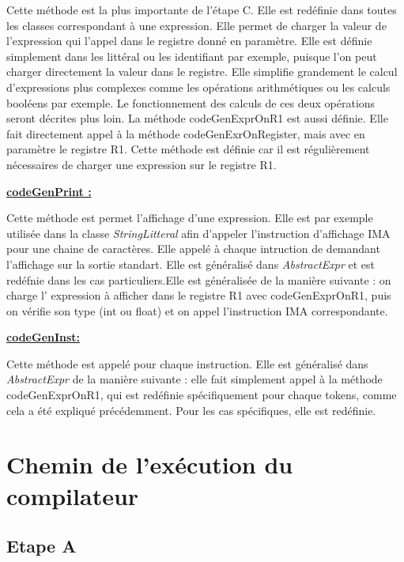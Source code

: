 \documentclass[12pt, a4paper, one side]{article}
\begin{document}
    Cette méthode est la plus importante de l'étape C. Elle est redéfinie dans
    toutes les classes correspondant à une expression. Elle permet de charger
    la valeur de l'expression qui l'appel dans le registre donné en paramètre.
    Elle est définie simplement dans les littéral ou les identifiant par
    exemple, puisque l'on peut charger directement la valeur dans le registre.
    Elle simplifie grandement le calcul d'expressions plus complexes comme
    les opérations arithmétiques ou les calculs booléens par exemple. Le fonctionnement
    des calculs de ces deux opérations seront décrites plus loin. La méthode
    codeGenExprOnR1 est aussi définie. Elle fait directement appel à la méthode
    codeGenExrOnRegister, mais avec en paramètre le registre R1. Cette méthode
    est définie car il est régulièrement nécessaires de charger une expression
    sur le registre R1.

    \medskip
    \textbf{\underline{codeGenPrint :}}

    Cette méthode est permet l'affichage d'une expression. Elle est par exemple
    utilisée dans la classe \textit{StringLitteral} afin d'appeler l'instruction d'affichage IMA pour une chaine de caractères. Elle appelé à chaque intruction de demandant l'affichage sur la sortie standart. Elle est généralisé dans \textit{AbstractExpr} et est redéfnie dans les cas particuliers.Elle est généralisée de la manière suivante : on charge l'
    expression à afficher dans le registre R1 avec codeGenExprOnR1, puis
    on vérifie son type (int ou float) et on appel l'instruction IMA correspondante.

    \medskip
    \textbf{\underline{codeGenInst:}}

    Cette méthode est appelé pour chaque instruction. Elle est généralisé dans
    \textit{AbstractExpr} de la manière suivante : elle fait simplement appel
    à la méthode codeGenExprOnR1, qui est redéfinie spécifiquement pour chaque
    tokens, comme cela a été expliqué précédemment. Pour les cas spécifiques, elle est redéfinie.

    \section{Chemin de l'exécution du compilateur}
    \subsection{Etape A}
\end{document}
